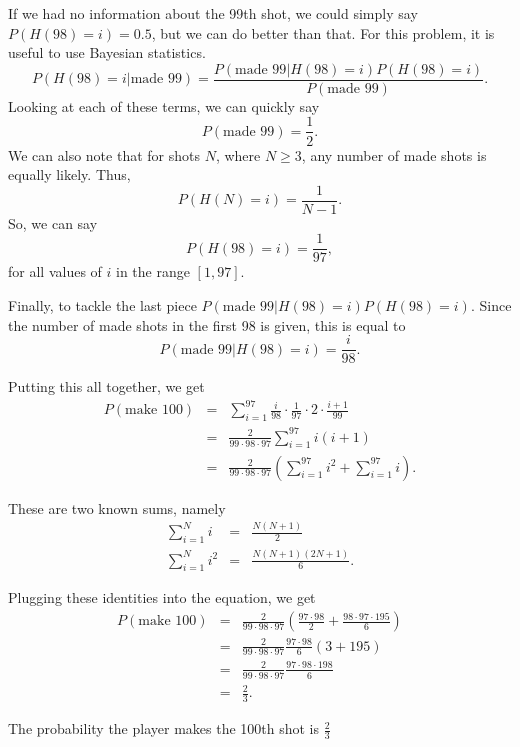 \documentclass[12]{article}
\begin{document}
If we had no information about the 99th shot, we could simply say
$P\left(H\left(98\right)=i\right)=0.5$, but we can do better than that.
For this problem, it is useful to use Bayesian statistics.
\begin{equation}
  P(H(98)=i | \text{made 99}) =
  \frac{P(\text{made 99} | H(98)=i) P(H(98)=i)}{P(\text{made 99})}.
\end{equation}
Looking at each of these terms, we can quickly say
\begin{equation}
  P(\text{made 99}) = \frac{1}{2}.
\end{equation}
We can also note that for shots $N$, where $N \geq 3$, any number of made shots
is equally likely.
Thus,
\begin{equation}
  P(H(N)=i) = \frac{1}{N-1}.
\end{equation}
So, we can say
\begin{equation}
  P(H(98)=i) = \frac{1}{97},
\end{equation}
for all values of $i$ in the range $[1,97]$.

Finally, to tackle the last piece $P(\text{made 99} | H(98)=i) P(H(98)=i)$.
Since the number of made shots in the first 98 is given, this is equal to
\begin{equation}
  P(\text{made 99} | H(98)=i) = \frac{i}{98}.
\end{equation}

Putting this all together, we get
\begin{eqnarray}
  P(\text{make 100})
  & = &
  \sum_{i=1}^{97}\frac{i}{98} \cdot \frac{1}{97} \cdot 2 \cdot \frac{i+1}{99} \\
  & = &
  \frac{2}{99\cdot98\cdot97} \sum_{i=1}^{97}i(i+1) \\
  & = &
  \frac{2}{99\cdot98\cdot97}\left(\sum_{i=1}^{97}i^2 + \sum_{i=1}^{97}i \right).
\end{eqnarray}

These are two known sums, namely
\begin{eqnarray}
  \sum_{i=1}^{N} i & = & \frac{N(N+1)}{2} \\
  \sum_{i=1}^{N} i^2 & = & \frac{N(N+1)(2N+1)}{6}.
\end{eqnarray}

Plugging these identities into the equation, we get
\begin{eqnarray}
  P(\text{make 100})
  & = &
  \frac{2}{99\cdot98\cdot97}
  \left(\frac{97\cdot98}{2} + \frac{98\cdot97\cdot195}{6} \right) \\
  & = &
  \frac{2}{99\cdot98\cdot97} \frac{97\cdot98}{6} \left(3 + 195\right) \\
  & = &
  \frac{2}{99\cdot98\cdot97} \frac{97\cdot98\cdot198}{6} \\
  & = &
  \frac{2}{3}.
\end{eqnarray}

The probability the player makes the 100th shot is $\frac{2}{3}$
\end{document}
